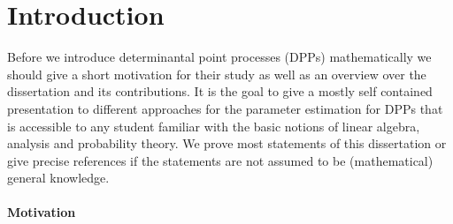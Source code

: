 \chapter*{Introduction}
\manualmark {}









Before we introduce determinantal point processes (DPPs) mathematically we should give a short motivation for their study as well as an overview over the dissertation and its contributions. It is the goal to give a mostly self contained presentation to different approaches for the parameter estimation for DPPs that is accessible to any student familiar with the basic notions of linear algebra, analysis and probability theory. We prove most statements of this dissertation or give precise references if the statements are not assumed to be (mathematical) general knowledge.

\subsubsection*{Motivation}

